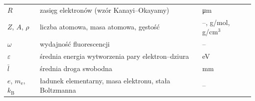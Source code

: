 {\begin{tabularx}{\linewidth}{@{}l>{\raggedright\arraybackslash}X>{\raggedright\arraybackslash}p{22mm}@{}}
$R$              & zasięg elektronów (wzór Kanayi--Okayamy) & \si{\micro\metre}\\
$Z$, $A$, $\rho$ & liczba atomowa, masa atomowa, gęstość & --, g/mol, g/cm$^3$\\
$\omega$         & wydajność fluorescencji & --\\
$\varepsilon$    & średnia energia wytworzenia pary elektron--dziura & \si{\electronvolt}\\
$\bar l$         & średnia droga swobodna & \si{\milli\metre}\\
$e$, $m_\mathrm{e}$, $k_\mathrm{B}$ & ładunek elementarny, masa elektronu, stała Boltzmanna & --\\
\end{tabularx}
\par}
